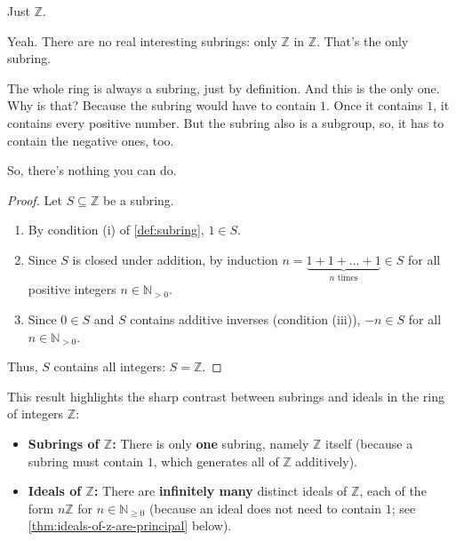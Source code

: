 \begin{student}
Just $\mathbb{Z}$.
\end{student}

\begin{speech}[00:46:53 - 00:47:40]
Yeah. There are no real interesting subrings: only $\mathbb{Z}$ in $\mathbb{Z}$.  That's the only subring.

The whole ring is always a subring, just by definition. And this is the only one. Why is that? Because the subring would have to contain $1$. Once it contains $1$, it contains every positive number. But the subring also is a subgroup, so, it has to contain the negative ones, too.

So, there's nothing you can do.
\end{speech}

\begin{content}

\begin{proof}
Let $S \subseteq \mathbb{Z}$ be a subring.
\begin{enumerate}[label=\textbf{(\arabic*)}]
    \item By condition (i) of \cref{def:subring}, $1 \in S$.
    \item Since $S$ is closed under addition, by induction $n = \underbrace{1 + 1 + \dots + 1}_{n \text{ times}} \in S$ for all positive integers $n \in \mathbb{N}_{>0}$.
    \item Since $0 \in S$ and $S$ contains additive inverses (condition (iii)), $-n \in S$ for all $n \in \mathbb{N}_{>0}$.
\end{enumerate}
Thus, $S$ contains all integers: $S = \mathbb{Z}$.
\end{proof}

\begin{steps}
This result highlights the sharp contrast between subrings and ideals in the ring of integers $\mathbb{Z}$:
\begin{itemize}
    \item \textbf{Subrings of $\mathbb{Z}$:} There is only \textbf{one} subring, namely $\mathbb{Z}$ itself (because a subring must contain $1$, which generates all of $\mathbb{Z}$ additively).
    \item \textbf{Ideals of $\mathbb{Z}$:} There are \textbf{infinitely many} distinct ideals of $\mathbb{Z}$, each of the form $n\mathbb{Z}$ for $n \in \mathbb{N}_{\ge 0}$ (because an ideal does not need to contain $1$; see \cref{thm:ideals-of-z-are-principal} below).
\end{itemize}
\end{steps}
\end{content}

